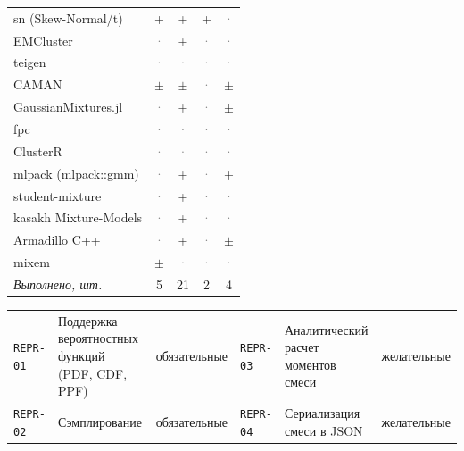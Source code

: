\documentclass[10pt,a4paper]{article}
\begin{document}
\begin{landscape}
{\begin{longtable}{@{}l *{4}{c}@{}}
sn (Skew-Normal/t) & \cellcolor{yes!35}+ & \cellcolor{yes!35}+ & \cellcolor{yes!35}+ & \textcolor{gray}{·} \\
EMCluster & \textcolor{gray}{·} & \cellcolor{yes!35}+ & \textcolor{gray}{·} & \textcolor{gray}{·} \\
teigen & \textcolor{gray}{·} & \textcolor{gray}{·} & \textcolor{gray}{·} & \textcolor{gray}{·} \\
CAMAN & \cellcolor{part!45}$\pm$ & \cellcolor{part!45}$\pm$ & \textcolor{gray}{·} & \cellcolor{part!45}$\pm$ \\
GaussianMixtures.jl & \textcolor{gray}{·} & \cellcolor{yes!35}+ & \textcolor{gray}{·} & \cellcolor{part!45}$\pm$ \\
fpc & \textcolor{gray}{·} & \textcolor{gray}{·} & \textcolor{gray}{·} & \textcolor{gray}{·} \\
ClusterR & \textcolor{gray}{·} & \textcolor{gray}{·} & \textcolor{gray}{·} & \textcolor{gray}{·} \\
mlpack (mlpack::gmm) & \textcolor{gray}{·} & \cellcolor{yes!35}+ & \textcolor{gray}{·} & \cellcolor{yes!35}+ \\
student-mixture & \textcolor{gray}{·} & \cellcolor{yes!35}+ & \textcolor{gray}{·} & \textcolor{gray}{·} \\
kasakh Mixture-Models & \textcolor{gray}{·} & \cellcolor{yes!35}+ & \textcolor{gray}{·} & \textcolor{gray}{·} \\
Armadillo C++ & \textcolor{gray}{·} & \cellcolor{yes!35}+ & \textcolor{gray}{·} & \cellcolor{part!45}$\pm$ \\
mixem & \cellcolor{part!45}$\pm$ & \textcolor{gray}{·} & \textcolor{gray}{·} & \textcolor{gray}{·} \\
\midrule \textit{Выполнено, шт.} & 5 & 21 & 2 & 4 \\
\bottomrule
\end{longtable}}
{\scriptsize\setlength{\tabcolsep}{3pt}
\begin{tabular}{@{}l >{\raggedright\arraybackslash}p{7.4cm} l l >{\raggedright\arraybackslash}p{7.4cm} l@{}}
\texttt{REPR-01} & Поддержка вероятностных функций (PDF, CDF, PPF) & обязательные & \texttt{REPR-03} & Аналитический расчет моментов смеси & желательные \\
\texttt{REPR-02} & Сэмплирование & обязательные & \texttt{REPR-04} & Сериализация смеси в JSON & желательные \\
\end{tabular}}


\end{landscape}
\end{document}
